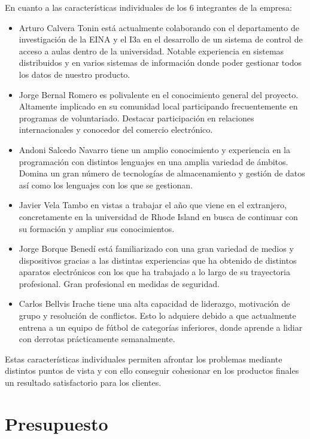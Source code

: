 \documentclass{article}
\begin{document}
En cuanto a las características individuales de los 6 integrantes de la empresa:
\begin{itemize}
   \item Arturo Calvera Tonin está actualmente colaborando con el departamento de investigación de la EINA y el I3a en el desarrollo de un sistema de control de acceso a aulas dentro de la universidad. Notable experiencia en sistemas distribuidos y en varios sistemas de información donde poder gestionar todos los datos de nuestro producto.
   \item Jorge Bernal Romero es polivalente en el conocimiento general del proyecto. Altamente implicado en su comunidad local participando frecuentemente en programas de voluntariado. Destacar participación en relaciones internacionales y conocedor del comercio electrónico.
   \item Andoni Salcedo Navarro tiene un amplio conocimiento y experiencia en la programación con distintos lenguajes en una amplia variedad de ámbitos. Domina un gran número de tecnologías de almacenamiento y gestión de datos así como los lenguajes con los que se gestionan.
   \item Javier Vela Tambo en vistas a trabajar el año que viene en el extranjero, concretamente en la universidad de Rhode Island en busca de continuar con su formación y ampliar sus conocimientos. 
   \item Jorge Borque Benedí está familiarizado con una gran variedad de medios y dispositivos gracias a las distintas experiencias que ha obtenido de distintos aparatos electrónicos con los que ha trabajado a lo largo de su trayectoria profesional. Gran profesional en medidas de seguridad.
   \item Carlos Bellvis Irache tiene una alta capacidad de liderazgo, motivación de grupo y resolución de conflictos. Esto lo adquiere debido a que actualmente entrena a un equipo de fútbol de categorías inferiores, donde aprende a lidiar con derrotas prácticamente semanalmente.
\end{itemize}
Estas características individuales permiten afrontar los problemas mediante distintos puntos de vista y con ello conseguir cohesionar en los productos finales un resultado satisfactorio para los clientes.

\pagebreak

\section{Presupuesto}
\end{document}
